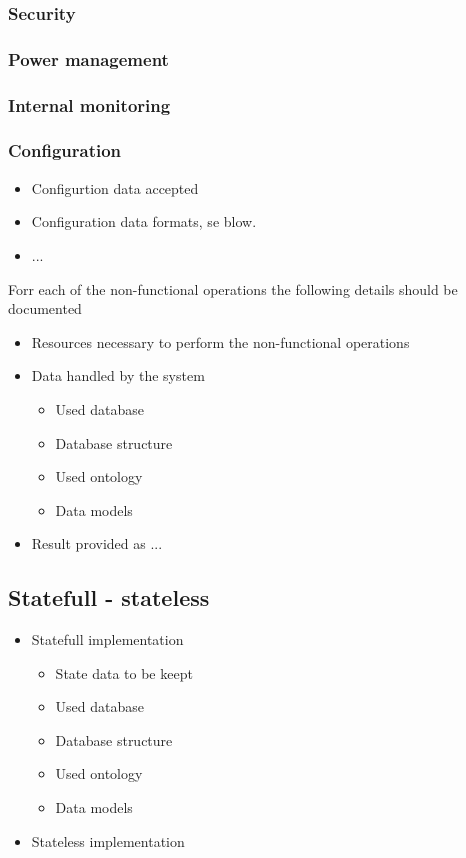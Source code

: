 \documentclass[a4paper]{arrowhead}
\begin{document}
\subsubsection {Security}
\subsubsection {Power management}
\subsubsection {Internal monitoring}
\subsubsection {Configuration}
  \begin{itemize}
  \item Configurtion data accepted
  \item Configuration data formats, se blow.
  \item ...  
  \end{itemize}  

Forr each of the non-functional operations the following details
should be documented 

\begin{itemize}
  \item Resources necessary to perform the non-functional operations
  \item Data handled by the system
    \begin{itemize}
    \item Used database
    \item Database structure
    \item Used ontology
    \item Data models
    \end{itemize}
  \item Result provided as ...
  \end{itemize}
\color{black}


\subsection {Statefull - stateless}
\color{red}
\begin{itemize}
  \item Statefull implementation 
    \begin{itemize}
    \item State data to be keept
    \item Used database
    \item Database structure
    \item Used ontology
    \item Data models
    \end{itemize}
  \item Stateless implementation
  \end{itemize}
\color{black}
\end{document}
